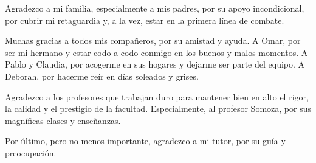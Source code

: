 \begin{acknowledgements}
    Agradezco a mi familia, especialmente a mis padres, por su apoyo incondicional, por cubrir mi retaguardia y, a la vez, estar en la primera l\'inea de combate.

    Muchas gracias a todos mis compa\~neros, por su amistad y ayuda. A Omar, por ser mi hermano y estar codo a codo conmigo en los buenos y malos momentos. A Pablo y Claudia, por acogerme en sus hogares y dejarme ser parte del equipo. A Deborah, por hacerme re\'ir en d\'ias soleados y grises.

    Agradezco a los profesores que trabajan duro para mantener bien en alto el rigor, la calidad y el prestigio de la facultad. Especialmente, al profesor Somoza, por sus magn\'ificas clases y ense\~nanzas.

    Por \'ultimo, pero no menos importante, agradezco a mi tutor, por su gu\'ia y preocupaci\'on.
\end{acknowledgements}